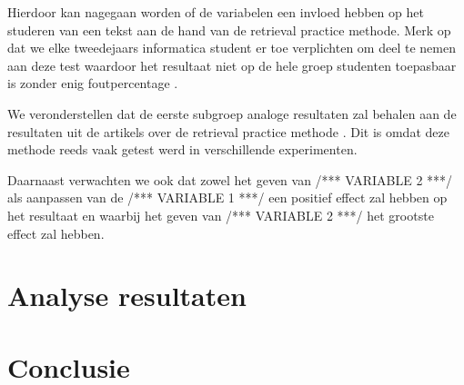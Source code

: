 \documentclass{hogent-article}
\begin{document}
	Hierdoor kan nagegaan worden of de variabelen een invloed hebben op het studeren van een tekst aan de hand van de retrieval practice methode. Merk op dat we elke tweedejaars informatica student er toe verplichten om deel te nemen aan deze test waardoor het resultaat niet op de hele groep studenten toepasbaar is zonder enig foutpercentage \autocite{karpicke2009metacognitive}.
	
	We veronderstellen dat de eerste subgroep analoge resultaten zal behalen aan de resultaten uit de artikels over de retrieval practice methode \autocite{butler2010repeated, pyc2012test, karpicke2007repeated, karpicke2008critical}. Dit is omdat deze methode reeds vaak getest werd in verschillende experimenten.
	
	Daarnaast verwachten we ook dat zowel het geven van /*** VARIABLE 2 ***/ als aanpassen van de /*** VARIABLE 1 ***/ een positief effect zal hebben op het resultaat en waarbij het geven van /*** VARIABLE 2 ***/ het grootste effect zal hebben.
	
	
	\section{Analyse resultaten}
	
	
	\section{Conclusie}
	
	
	
	
	\printbibliography[heading=bibintoc]
	
\end{document}
